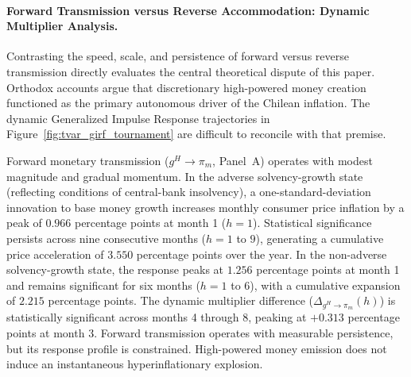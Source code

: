 \paragraph{Forward Transmission versus Reverse Accommodation: Dynamic Multiplier Analysis.}
Contrasting the speed, scale, and persistence of forward versus reverse transmission directly evaluates the central theoretical dispute of this paper. Orthodox accounts \citep{DornbuschEdwards1990,Edwards2024} argue that discretionary high-powered money creation functioned as the primary autonomous driver of the Chilean inflation. The dynamic Generalized Impulse Response trajectories in Figure~\ref{fig:tvar_girf_tournament} are difficult to reconcile with that premise. 

Forward monetary transmission ($g^H \to \pi_m$, Panel~A) operates with modest magnitude and gradual momentum. In the adverse solvency-growth state (reflecting conditions of central-bank insolvency), a one-standard-deviation innovation to base money growth increases monthly consumer price inflation by a peak of $0.966$ percentage points at month 1 ($h=1$). Statistical significance persists across nine consecutive months ($h=1$ to $9$), generating a cumulative price acceleration of $3.550$ percentage points over the year. In the non-adverse solvency-growth state, the response peaks at $1.256$ percentage points at month 1 and remains significant for six months ($h=1$ to $6$), with a cumulative expansion of $2.215$ percentage points. The dynamic multiplier difference ($\Delta_{g^H \to \pi_m}(h)$) is statistically significant across months 4 through 8, peaking at $+0.313$ percentage points at month 3. Forward transmission operates with measurable persistence, but its response profile is constrained. High-powered money emission does not induce an instantaneous hyperinflationary explosion.

